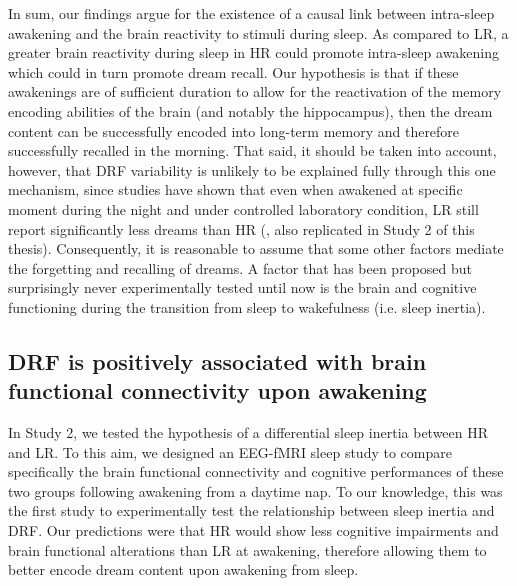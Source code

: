 In sum, our findings argue for the existence of a causal link between intra-sleep awakening and the brain reactivity to stimuli during sleep. As compared to LR, a greater brain reactivity during sleep in HR could promote intra-sleep awakening which could in turn promote dream recall. Our hypothesis is that if these awakenings are of sufficient duration to allow for the reactivation of the memory encoding abilities of the brain (and notably the hippocampus), then the dream content can be successfully encoded into long-term memory and therefore successfully recalled in the morning. That said, it should be taken into account, however, that DRF variability is unlikely to be explained fully through this one mechanism, since studies have shown that even when awakened at specific moment during the night and under controlled laboratory condition, LR still report significantly less dreams than HR (\citealp{goodenough_comparison_1959}, also replicated in Study 2 of this thesis). Consequently, it is reasonable to assume that some other factors mediate the forgetting and recalling of dreams. A factor that has been proposed but surprisingly never experimentally tested until now is the brain and cognitive functioning during the transition from sleep to wakefulness (i.e. sleep inertia).

\subsection{DRF is positively associated with brain functional connectivity upon awakening}
\label{disc:drf:summary:inertia}

In Study 2, we tested the hypothesis of a differential sleep inertia between HR and LR. To this aim, we designed an EEG-fMRI sleep study to compare specifically the brain functional connectivity and cognitive performances of these two groups following awakening from a daytime nap. To our knowledge, this was the first study to experimentally test the relationship between sleep inertia and DRF. Our predictions were that HR would show less cognitive impairments and brain functional alterations than LR at awakening, therefore allowing them to better encode dream content upon awakening from sleep.


